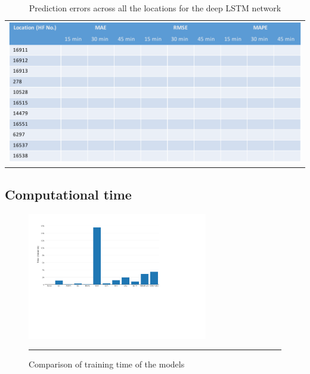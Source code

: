 \begin{table}
    \begin{tabular}{c}
        \includegraphics[width=\textwidth,height=\textheight,keepaspectratio]{Figures/errors-locations-table.pdf}
    \end{tabular}
    \caption[Prediction errors across all the locations for the deep LSTM network]{Prediction
    errors across all the locations for the deep LSTM network}
    \label{table:locationErrors}
\end{table}

\subsection{Computational time}

\begin{figure}[htbp]
    \centering
    \includegraphics[width=0.7\textwidth]{Plots/training-time.pdf}
    \rule{35em}{0.5pt}
   \caption[Comparison of training time of the models]{Comparison of training time of the models}
    \label{fig:trainingTime}
\end{figure}


